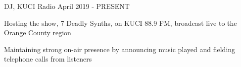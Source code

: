 
\begin {cventries}
  \cventry
    {DJ, KUCI}
    {Radio}
    {}
    {April 2019 - PRESENT}
    {
      \begin{cvitems}
        \item {Hosting the show, 7 Deadly Synths, on KUCI 88.9 FM, broadcast live to the Orange County region}
        \item {Maintaining strong on-air presence by announcing music played and fielding telephone calls from listeners}
      \end{cvitems}
    }
\end{cventries}